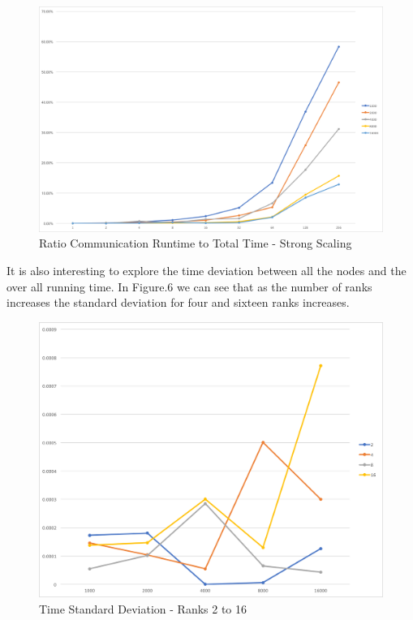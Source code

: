 \documentclass[12pt]{article} %
\begin{document}
\begin{figure}[ht]
\caption{Ratio Communication Runtime to Total Time - Strong Scaling}\label{fig:benchmark05}
\centering
\includegraphics[width=\textwidth,keepaspectratio]{imgs/img05.png}
\end{figure}

\newpage

It is also interesting to explore the time deviation between all the nodes and the over all running time. In Figure.6 we can see that as the number of ranks increases the standard deviation for four and sixteen ranks increases.

\begin{figure}[htb]
\caption{Time Standard Deviation - Ranks 2 to 16 }\label{fig:benchmark05}
\centering
\includegraphics[width=\textwidth,keepaspectratio]{imgs/img08.png}
\end{figure}
\end{document}
